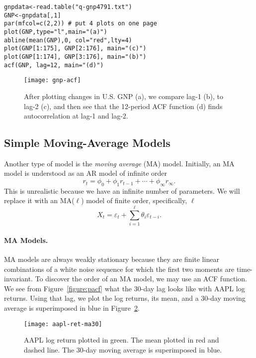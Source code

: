 \begin{verbatim}
gnpdata<-read.table("q-gnp4791.txt")
GNP<-gnpdata[,1]
par(mfcol=c(2,2)) # put 4 plots on one page
plot(GNP,type="l",main="(a)") 
abline(mean(GNP),0, col="red",lty=4)
plot(GNP[1:175], GNP[2:176], main="(c)")
plot(GNP[1:174], GNP[3:176], main="(b)")
acf(GNP, lag=12, main="(d)") 
\end{verbatim}

\begin{figure}[tb]
  \centering
  \texttt{[image: gnp-acf]}
  \caption[Analysis of U.S. GNP with ACF function]{After plotting changes in U.S. GNP (a), we compare lag-1 (b), to lag-2 (c), and then see that the 12-period ACF function (d) finds autocorrelation at lag-1 and lag-2.}
  \label{figure:gnp-acf}
\end{figure}

\subsection{Simple Moving-Average Models}
Another type of \fts{} model is the \emph{moving average} (MA) model. Initially, an MA model is understood as an AR model of infinite order
\[
r_t = \phi_0 + \phi_1 r_{t-1} + \cdots + \phi_{\infty} r_{\infty}.
\]
This is unrealistic because we have an infinite number of parameters. We will replace it with an MA($\ell$) model of finite order, specifically, $\ell$
\[
X_t = \varepsilon_t + \sum_{i=1}^\ell \theta_i \varepsilon_{t-i}.
\]

\paragraph{MA Models.} MA models are always weakly stationary because they are finite linear combinations of a white noise sequence for which the first two moments are time-invariant. To discover the order of an MA model, we may use an ACF function. We see from Figure~\ref{figure:pacf} what the 30-day lag looks like with AAPL log returns. Using that lag, we plot the log returns, its mean, and a 30-day moving average is superimposed in blue in Figure~\ref{figure:aapl-ret-ma30}.

\begin{figure}[tb]
  \centering
  \texttt{[image: aapl-ret-ma30]}
  \caption[AAPL Log Returns and MA(30)]{AAPL log return plotted in green. The mean plotted in red and dashed line. The 30-day moving average is superimposed in blue.}
  \label{figure:aapl-ret-ma30}
\end{figure}



